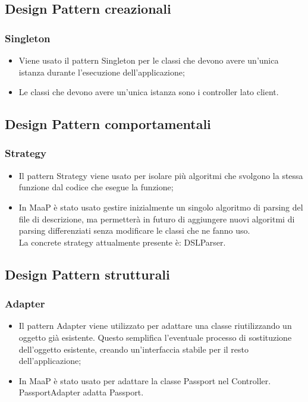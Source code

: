 \subsection{Design Pattern creazionali}
\subsubsection{Singleton}
\begin{itemize}
\item {} Viene usato il pattern Singleton per le classi che devono avere un'unica istanza durante l'esecuzione dell'applicazione;
\item {} Le classi che devono avere un'unica istanza sono i controller lato client.
\end{itemize}

\subsection{Design Pattern comportamentali}
\subsubsection{Strategy}
\begin{itemize}
\item {} Il pattern Strategy viene usato per isolare più algoritmi che svolgono la stessa funzione dal codice che esegue la funzione;
\item {} In MaaP è stato usato gestire inizialmente un singolo algoritmo di parsing del file di descrizione, ma permetterà in futuro di aggiungere nuovi algoritmi di parsing differenziati senza modificare le classi che ne fanno uso.\\
La concrete strategy attualmente presente è: DSLParser.
\end{itemize}

\subsection{Design Pattern strutturali}
\subsubsection{Adapter}
\begin{itemize}
\item {} Il pattern Adapter viene utilizzato per adattare una classe riutilizzando un oggetto già esistente. Questo semplifica l'eventuale processo di sostituzione dell'oggetto esistente, creando un'interfaccia stabile per il resto dell'applicazione;
\item {} In MaaP è stato usato per adattare la classe Passport nel Controller. PassportAdapter adatta Passport.
\end{itemize}

